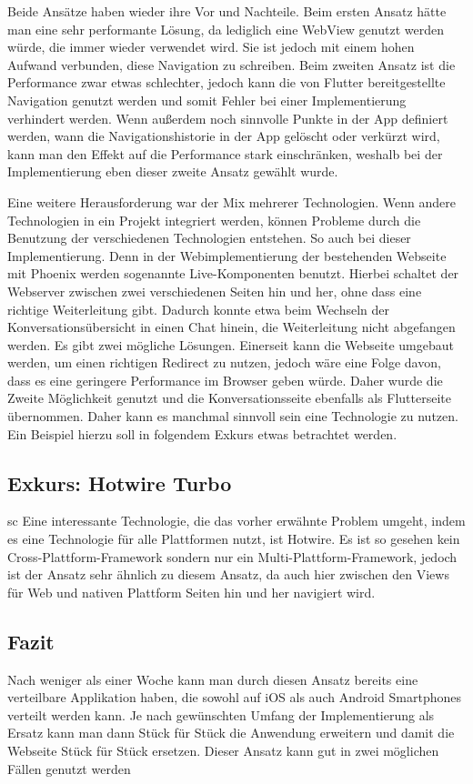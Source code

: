 Beide Ansätze haben wieder ihre Vor und Nachteile. Beim ersten Ansatz hätte man eine sehr performante Lösung, da lediglich eine WebView genutzt werden würde, die immer wieder verwendet wird. Sie ist jedoch mit einem hohen Aufwand verbunden, diese Navigation zu schreiben. Beim zweiten Ansatz ist die Performance zwar etwas schlechter, jedoch kann die von Flutter bereitgestellte Navigation genutzt werden und somit Fehler bei einer Implementierung verhindert werden. Wenn außerdem noch sinnvolle Punkte in der App definiert werden, wann die Navigationshistorie in der App gelöscht oder verkürzt wird, kann man den Effekt auf die Performance stark einschränken, weshalb bei der Implementierung eben dieser zweite Ansatz gewählt wurde. 

Eine weitere Herausforderung war der Mix mehrerer Technologien. Wenn andere Technologien in ein Projekt integriert werden, können Probleme durch die Benutzung der verschiedenen Technologien entstehen. So auch bei dieser Implementierung. Denn in der Webimplementierung der bestehenden Webseite mit Phoenix werden sogenannte Live-Komponenten benutzt. Hierbei schaltet der Webserver zwischen zwei verschiedenen Seiten hin und her, ohne dass eine richtige Weiterleitung gibt. Dadurch konnte etwa beim Wechseln der Konversationsübersicht in einen Chat hinein, die Weiterleitung nicht abgefangen werden. Es gibt zwei mögliche Lösungen. Einerseit kann die Webseite umgebaut werden, um einen richtigen Redirect zu nutzen, jedoch wäre eine Folge davon,  dass es eine geringere Performance im Browser geben würde. Daher wurde die Zweite Möglichkeit genutzt und die Konversationsseite ebenfalls als Flutterseite übernommen. Daher kann es manchmal sinnvoll sein eine Technologie zu nutzen. Ein Beispiel hierzu soll in folgendem Exkurs etwas betrachtet werden.



\subsection{Exkurs: Hotwire Turbo}
sc
Eine interessante Technologie, die das vorher erwähnte Problem umgeht, indem es eine Technologie für alle Plattformen nutzt, ist Hotwire. Es ist so gesehen kein Cross-Plattform-Framework sondern nur ein Multi-Plattform-Framework, jedoch ist der Ansatz sehr ähnlich zu diesem Ansatz, da auch hier zwischen den Views für Web und nativen Plattform Seiten hin und her navigiert wird. 

\subsection{Fazit}
Nach weniger als einer Woche kann man durch diesen Ansatz bereits eine verteilbare Applikation haben, die sowohl auf iOS als auch Android Smartphones verteilt werden kann. Je nach gewünschten Umfang der Implementierung als Ersatz kann man dann Stück für Stück die Anwendung erweitern und damit die Webseite Stück für Stück ersetzen. Dieser Ansatz kann gut in zwei möglichen Fällen genutzt werden